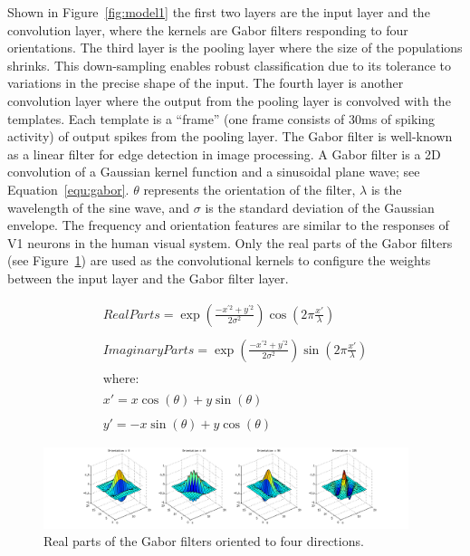 \documentclass[journal]{journal}
\begin{document}
Shown in Figure~\ref{fig:model1} the first two layers are the input layer and the convolution layer, where the kernels are Gabor filters responding to four orientations. 
The third layer is the pooling layer where the size of the populations shrinks. 
This down-sampling enables robust classification due to its tolerance to variations in the precise shape of the input. 
The fourth layer is another convolution layer where the output from the pooling layer is convolved with the templates. 
Each template is a “frame” (one frame consists of 30ms of spiking activity) of output spikes from the pooling layer.
The Gabor filter is well-known as a linear filter for edge detection in image processing. 
A Gabor filter is a 2D convolution of a Gaussian kernel function and a sinusoidal plane wave; see Equation~\ref{equ:gabor}. 
$\theta$ represents the orientation of the filter, $\lambda$ is the wavelength of the sine wave, and $\sigma$ is the standard deviation of the Gaussian envelope. 
The frequency and orientation features are similar to the responses of V1 neurons in the human visual system. 
Only the real parts of the Gabor filters (see Figure~\ref{fig:gabor}) are used as the convolutional kernels to configure the weights between the input layer and the Gabor filter layer.

\begin{equation}
\begin{array}{l}
\mathit{Real Parts} = \exp \left(\frac{-x^{'2}+y^{'2}}{2\sigma ^{2}}\right)\cos \left(2\pi\frac{{x}'}{\lambda }\right)
\\
\\
\mathit{Imaginary Parts} = \exp \left(\frac{-x^{'2}+y^{'2}}{2\sigma ^{2}}\right)\sin \left(2\pi\frac{{x}'}{\lambda }\right)
\\
\\
\mathrm{where:}
\\
\\
{x}'=x\cos (\theta ) + y\sin (\theta)
\\
\\
{y}'=-x\sin (\theta ) + y\cos (\theta)
\end{array}
\label{equ:gabor}
\end{equation}


\begin{figure}
\centering
	\includegraphics[width=0.95\textwidth]{pics/gabor.png}
	\caption{Real parts of the Gabor filters oriented to four directions.}
	\label{fig:gabor}
\end{figure}
\end{document}

